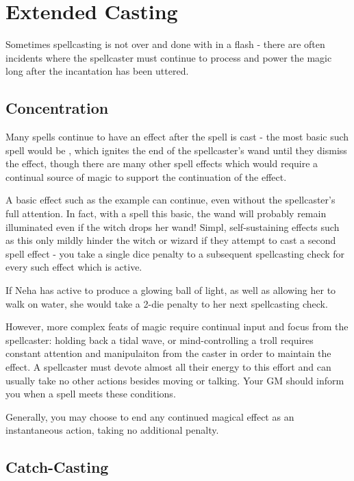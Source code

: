 \section{Extended Casting}

Sometimes spellcasting is not over and done with in a flash - there are often incidents where the spellcaster must continue to process and power the magic long after the incantation has been uttered.

\subsection{Concentration}

Many spells continue to have an effect after the spell is cast - the most basic such spell would be , which ignites the end of the spellcaster's wand until they dismiss the effect, though there are many other spell effects which would require a continual source of magic to support the continuation of the effect.

A basic effect such as the  example can continue, even without the spellcaster's full attention. In fact, with a spell this basic, the wand will probably remain illuminated even if the witch drops her wand! Simpl, self-sustaining effects such as this only mildly hinder the witch or wizard if they attempt to cast a second spell effect - you take a single dice penalty to a subsequent spellcasting check for every such effect which is active. 

If Neha has  active to produce a glowing ball of light, as well as  allowing her to walk on water, she would take a 2-die penalty to her next spellcasting check. 

However, more complex feats of magic require continual input and focus from the spellcaster: holding back a tidal wave, or mind-controlling a troll requires constant attention and manipulaiton from the caster in order to maintain the effect. A spellcaster must devote almost all their energy to this effort and can usually take no other actions besides moving or talking. Your GM should inform you when a spell meets these conditions. 

Generally, you may choose to end any continued magical effect as an instantaneous action, taking no additional penalty. 

\subsection{Catch-Casting}

